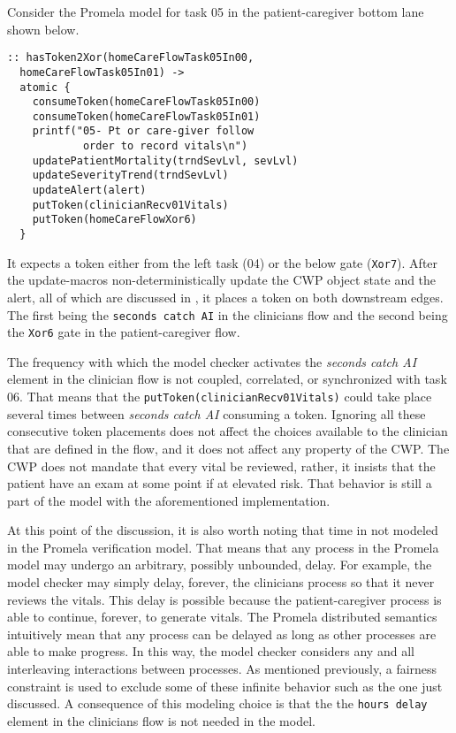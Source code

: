 Consider the Promela model for task 05 in the patient-caregiver bottom lane shown below.
%
{\small
\begin{lstlisting}[style=myPromela]
:: hasToken2Xor(homeCareFlowTask05In00, 
  homeCareFlowTask05In01) ->
  atomic {
    consumeToken(homeCareFlowTask05In00)
    consumeToken(homeCareFlowTask05In01)
    printf("05- Pt or care-giver follow
            order to record vitals\n")
    updatePatientMortality(trndSevLvl, sevLvl)
    updateSeverityTrend(trndSevLvl)
    updateAlert(alert)
    putToken(clinicianRecv01Vitals)
    putToken(homeCareFlowXor6)
  }
\end{lstlisting}
}
%
\noindent It expects a token either from the left task (04) or the below gate (\texttt{Xor7}). After the update-macros non-deterministically update the CWP object state and the alert, all of which are discussed in , it places a token on both downstream edges. The first being the \texttt{seconds catch AI} in the clinicians flow and the second being the \texttt{Xor6} gate in the patient-caregiver flow. 

The frequency with which the model checker activates the \emph{seconds catch AI} element in the clinician flow is not coupled, correlated, or synchronized with task 06. That means that the \texttt{putToken(clinicianRecv01Vitals)} could take place several times between \emph{seconds catch AI} consuming a token. Ignoring all these consecutive token placements does not affect the choices available to the clinician that are defined in the flow, and it does not affect any property of the CWP. The CWP does not mandate that every vital be reviewed, rather, it insists that the patient have an exam at some point if at elevated risk. That behavior is still a part of the model with the aforementioned implementation.

At this point of the discussion, it is also worth noting that time in not modeled in the Promela verification model. That means that any process in the Promela model may undergo an arbitrary, possibly unbounded, delay. For example, the model checker may simply delay, forever, the clinicians process so that it never reviews the vitals. This delay is possible because the patient-caregiver process is able to continue, forever, to generate vitals. The Promela distributed semantics intuitively mean that any process can be delayed as long as other processes are able to make progress. In this way, the model checker considers any and all interleaving interactions between processes. As mentioned previously, a fairness constraint is used to exclude some of these infinite behavior such as the one just discussed. A consequence of this modeling choice is that the the \texttt{hours delay} element in the clinicians flow is not needed in the model.

